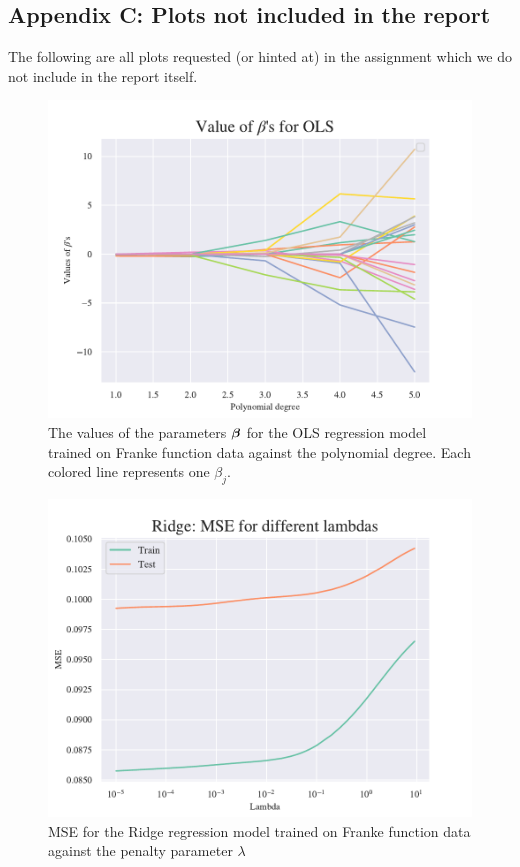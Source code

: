 \clearpage

\subsection{Appendix C: Plots not included in the report} \label{appendixD}
The following are all plots requested (or hinted at) in the assignment which we do not include in the report itself.

\begin{figure}[H]
    \centering
    \includegraphics[width=1\linewidth]{project_1/figures/figures_in_appendix/OLS_Betas_Franke_Noise.pdf}
    \caption{The values of the parameters $\boldsymbol{\beta}$ for the OLS regression model trained on Franke function data
    against the polynomial degree. Each colored line represents one $\beta_j$. }
    \label{fig:ref1}
\end{figure}

\begin{figure}[H]
    \centering
    \includegraphics[width=1\linewidth]{project_1/figures/figures_in_appendix/Ridge_MSE_Franke_Noise.pdf}
    \caption{MSE for the Ridge regression model trained on Franke function data against the penalty parameter $\lambda$}
    \label{fig:ref2}
\end{figure}

